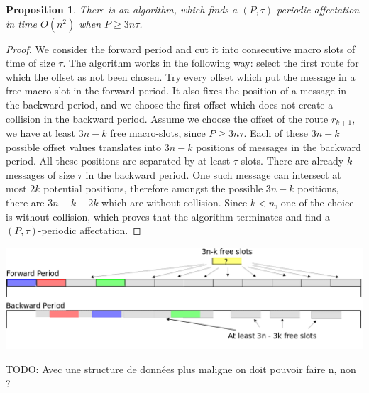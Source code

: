 \documentclass[a4paper,10pt]{article}
\newtheorem{proposition}{Proposition}
\newcommand{\todo}[1]{{\color{red} TODO: {#1}}}
\begin{document}
    \begin{proposition}
    There is an algorithm, which finds a $(P,\tau)$-periodic affectation in time $O(n^2)$ when $P \geq 3n\tau$.
    \end{proposition}
    \begin{proof}
     We consider the forward period and cut it into consecutive macro slots of time of size $\tau$. The algorithm works in the following way: select the first route for which the offset as not been chosen. Try every offset which put the message in a  
     free macro slot in the forward period. It also fixes the position of a message in the backward period, and we choose the first offset which does not create a collision in the backward period. 
     Assume we choose the offset of the route $r_{k+1}$, we have  at least $3n - k$ free macro-slots, since $P \geq 3n\tau$. Each of these $3n - k$ possible offset values translates into $3n - k$ positions of messages in the backward period. All these positions are separated by at least $\tau$ slots. There are already $k$ messages of size $\tau$ in the backward period. One such message can intersect at most $2k$ potential positions, therefore  amongst the possible $3n - k$ positions, there are  $3n - k -2k$ which are without collision. Since $k < n$, one of the choice is without collision, which proves that the algorithm terminates and find a
     $(P,\tau)$-periodic affectation. 
     \end{proof}
      
      \begin{center}
      \includegraphics[scale=0.3]{ex3nt.png}
      \end{center}

    \todo{Avec une structure de données plus maligne on doit pouvoir faire n, non ?}
   
\end{document}
